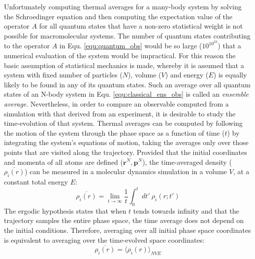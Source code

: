 Unfortunately computing thermal averages for a many-body system by solving the Schroedinger equation and then computing the expectation value of the operator $A$ for all quantum states that have a non-zero statistical weight is not possible for macromolecular systems. The number of quantum states contributing to the operator $A$ in Equ. \ref{equ:quantum_obs} would be so large ($10^{10^{23}}$) that a numerical evaluation of the system would be impractical. For this reason the basic assumption of statistical mechanics is made, whereby it is assumed that a system with fixed number of particles ($N$), volume ($V$) and energy ($E$) is equally likely to be found in any of its quantum states. Such an average over all quantum states of an N-body system in Equ. \ref{equ:classical_ens_obs} is called an \textit{ensemble average}. Nevertheless, in order to compare an observable computed from a simulation with that derived from an experiment, it is desirable to study the time-evolution of that system. Thermal averages can be computed by following the motion of the system through the phase space as a function of time ($t$) by integrating the system's equations of motion, taking the averages only over those points that are visited along the trajectory. Provided that the initial coordinates and momenta of all atoms are defined ($\mathbf{r}^{N}, \mathbf{p}^{N}$), the time-averaged density ($\overline{\rho_{i}(r)}$) can be measured in a molecular dynamics simulation in a volume $V$, at a constant total energy $E$:
%
%
\begin{equation}
\overline{\rho_{i}(r)} = \displaystyle\lim_{t \to \infty} \frac{1}{t} \int_{0}^{t} \: dt' \: \rho_{i}(r;t')
\end{equation}
%
%
The ergodic hypothesis states that when $t$ tends towards infinity and that the trajectory samples the entire phase space, the time average does not depend on the initial conditions. Therefore, averaging over all initial phase space coordinates is equivalent to averaging over the time-evolved space coordinates:
%
%
\begin{equation}
\overline{\rho_{i}(r)} = \langle \rho_{i}(r) \rangle_{NVE}
\label{equ:ergodic_hyp}
\end{equation}
%
%
